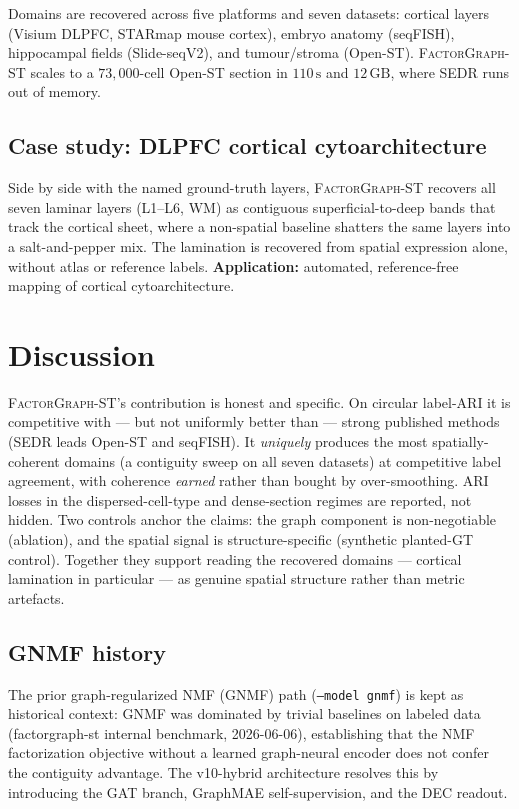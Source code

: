 \documentclass[10pt,letterpaper]{article}
\begin{document}
Domains are recovered across five platforms and seven datasets: cortical layers (Visium
DLPFC, STARmap mouse cortex), embryo anatomy (seqFISH), hippocampal fields (Slide-seqV2),
and tumour/stroma (Open-ST). \textsc{FactorGraph-ST} scales to a $73{,}000$-cell Open-ST
section in $110\,\text{s}$ and $12\,\text{GB}$, where SEDR runs out of memory.

\subsection{Case study: DLPFC cortical cytoarchitecture}
\label{sec:casestudy}

Side by side with the named ground-truth layers, \textsc{FactorGraph-ST} recovers all
seven laminar layers (L1--L6, WM) as contiguous superficial-to-deep bands that track the
cortical sheet, where a non-spatial baseline shatters the same layers into a salt-and-pepper
mix. The lamination is recovered from spatial expression alone, without atlas or reference
labels. \textbf{Application:} automated, reference-free mapping of cortical cytoarchitecture.

\section{Discussion}
\label{sec:discussion}

\textsc{FactorGraph-ST}'s contribution is honest and specific. On circular label-ARI it is
competitive with --- but not uniformly better than --- strong published methods (SEDR leads
Open-ST and seqFISH). It \emph{uniquely} produces the most spatially-coherent domains (a
contiguity sweep on all seven datasets) at competitive label agreement, with coherence
\emph{earned} rather than bought by over-smoothing. ARI losses in the dispersed-cell-type
and dense-section regimes are reported, not hidden. Two controls anchor the claims: the
graph component is non-negotiable (ablation), and the spatial signal is structure-specific
(synthetic planted-GT control). Together they support reading the recovered domains ---
cortical lamination in particular --- as genuine spatial structure rather than metric
artefacts.

\subsection*{GNMF history}
\label{sec:gnmf-history}

The prior graph-regularized NMF (GNMF) path (\texttt{--model gnmf}) is kept as historical
context: GNMF was dominated by trivial baselines on labeled data (factorgraph-st internal
benchmark, 2026-06-06), establishing that the NMF factorization objective without a learned
graph-neural encoder does not confer the contiguity advantage. The v10-hybrid architecture
resolves this by introducing the GAT branch, GraphMAE self-supervision, and the DEC readout.
\end{document}
